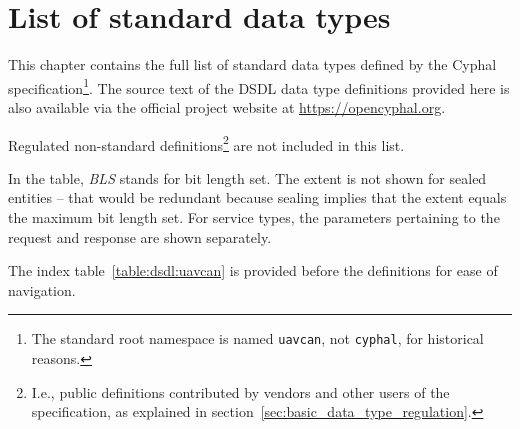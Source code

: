\chapter{List of standard data types}\label{sec:sdt}

This chapter contains the full list of standard data types defined by the Cyphal specification\footnote{%
    The standard root namespace is named \texttt{uavcan}, not \texttt{cyphal}, for historical reasons.
}.
The source text of the DSDL data type definitions provided here is also available via the
official project website at \mbox{\url{https://opencyphal.org}}.

Regulated non-standard definitions\footnote{%
    I.e., public definitions contributed by vendors and other users
    of the specification, as explained in section~\ref{sec:basic_data_type_regulation}.
} are not included in this list.

In the table, \emph{BLS} stands for bit length set.
The extent is not shown for sealed entities -- that would be redundant because sealing implies
that the extent equals the maximum bit length set.
For service types, the parameters pertaining to the request and response are shown separately.

The index table~\ref{table:dsdl:uavcan} is provided before the definitions for ease of navigation.

\clearpage{}
